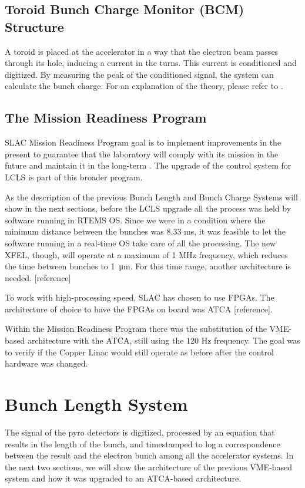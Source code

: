 \documentclass[letter,
        biblatex,   %
        keeplastbox,  %
        ]{jacow}
\begin{document}
\subsection{Toroid Bunch Charge Monitor (BCM) Structure}
A toroid is placed at the accelerator in a way that the electron beam passes through its hole, inducing a current in the turns. This current is conditioned and digitized. By measuring the peak of the conditioned signal, the system can calculate the bunch charge. For an explanation of the theory, please refer to \cite{slac-pub-398}.

\subsection{The Mission Readiness Program}
SLAC Mission Readiness Program goal is to implement improvements in the present to guarantee that the laboratory will comply with its mission in the future and maintain it in the long-term \cite{doe-MR}. The upgrade of the control system for LCLS is part of this broader program.

As the description of the previous Bunch Length and Bunch Charge Systems will show in the next sections, before the LCLS upgrade all the process was held by software running in RTEMS OS. Since we were in a condition where the minimum distance between the bunches was 8.33 ms, it was feasible to let the software running in a real-time OS take care of all the processing. The new XFEL, though, will operate at a maximum of 1 MHz frequency, which reduces the time between bunches to \SI{1}{\micro\meter}. For this time range, another architecture is needed. [reference]

To work with high-processing speed, SLAC has chosen to use FPGAs. The architecture of choice to have the FPGAs on board was ATCA [reference].

Within the Mission Readiness Program there was the substitution of the VME-based architecture with the ATCA, still using the 120 Hz frequency. The goal was to verify if the Copper Linac would still operate as before after the control hardware was changed.

\section{Bunch Length System}
The signal of the pyro detectors is digitized, processed by an equation that results in the length of the bunch, and timestamped to log a correspondence between the result and the electron bunch among all the accelerator systems. In the next two sections, we will show the architecture of the previous VME-based system and how it was upgraded to an ATCA-based architecture.
\end{document}
